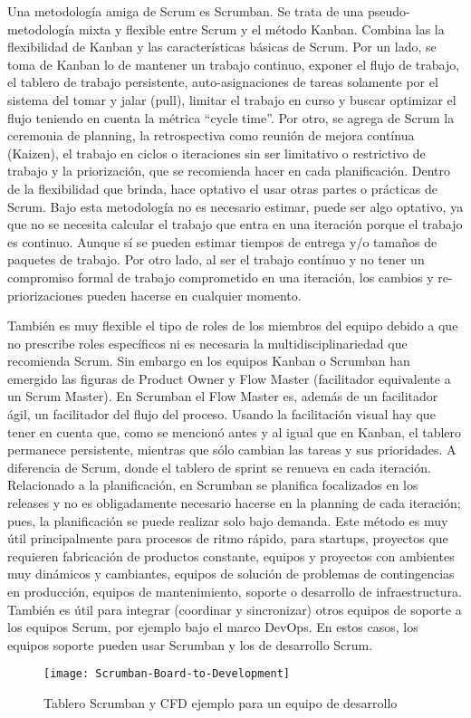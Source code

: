 Una metodología amiga de Scrum es Scrumban. Se trata de una pseudo-metodología mixta y flexible entre Scrum y el método Kanban. Combina las la flexibilidad de Kanban y las características básicas de Scrum. Por un lado, se toma de Kanban lo de mantener un trabajo continuo, exponer el flujo de trabajo, el tablero de trabajo persistente, auto-asignaciones de tareas solamente por el sistema del tomar y jalar (pull), limitar el trabajo en curso y buscar optimizar el flujo teniendo en cuenta la métrica “cycle time”. Por otro, se agrega de Scrum la ceremonia de planning, la retrospectiva como reunión de mejora contínua (Kaizen), el trabajo en ciclos o iteraciones sin ser limitativo o restrictivo de trabajo y la priorización, que se recomienda hacer en cada planificación. Dentro de la flexibilidad que brinda, hace optativo el usar otras partes o prácticas de Scrum. Bajo esta metodología no es necesario estimar, puede ser algo optativo, ya que no se necesita calcular el trabajo que entra en una iteración porque el trabajo es continuo. Aunque sí se pueden estimar tiempos de entrega y/o tamaños de paquetes de trabajo. Por otro lado, al ser el trabajo contínuo y no tener un compromiso formal de trabajo comprometido en una iteración, los cambios y re-priorizaciones pueden hacerse en cualquier momento. 
 
También es muy flexible el tipo de roles de los miembros del equipo debido a que no prescribe roles específicos ni es necesaria la multidisciplinariedad que recomienda Scrum. Sin embargo en los equipos Kanban o Scrumban han emergido las figuras de Product Owner y Flow Master (facilitador equivalente a un Scrum Master). En Scrumban el Flow Master es, además de un facilitador ágil, un facilitador del flujo del proceso. Usando la facilitación visual hay que tener en cuenta que, como se mencionó antes y al igual que en Kanban, el tablero permanece persistente, mientras que sólo cambian las tareas y sus prioridades. A diferencia de Scrum, donde el tablero de sprint se renueva en cada iteración. Relacionado a la planificación, en Scrumban se planifica focalizados en los releases y no es obligadamente necesario hacerse en la planning de cada iteración; pues, la planificación se puede realizar solo bajo demanda. Este método es muy útil principalmente para procesos de ritmo rápido, para startups, proyectos que requieren fabricación de productos constante, equipos y proyectos con ambientes muy dinámicos y cambiantes, equipos de solución de problemas de contingencias en producción, equipos de mantenimiento, soporte o desarrollo de infraestructura. También es útil para integrar (coordinar y sincronizar) otros equipos de soporte a los equipos Scrum, por ejemplo bajo el marco DevOps. En estos casos, los equipos soporte pueden usar Scrumban y los de desarrollo Scrum.



\begin{figure}[h]
  \centering
  \texttt{[image: Scrumban-Board-to-Development]}
  \caption{Tablero Scrumban y CFD ejemplo para un equipo de desarrollo}
  \centering
  \label{fig:Scrumban-Board-to-Development} %
\end{figure}
